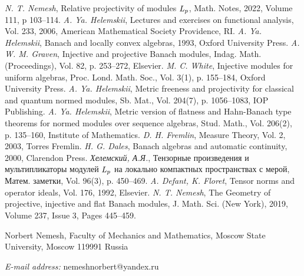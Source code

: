 \documentclass[12pt]{article}
\begin{document}
\begin{thebibliography}{999}
    \textit{N. T. Nemesh}, Relative projectivity of 
    modules $\it{L_p}$, Math. Notes, 2022, Volume 111, p 103--114.
    \textit{A. Ya. Helemskii}, Lectures and 
    exercises on functional analysis, Vol. 233, {2006}, 
    American Mathematical Society Providence, RI.
    \textit{A. Ya. Helemskii}, Banach and locally 
    convex algebras, {1993}, Oxford University Press.
    \textit{A. W. M. Graven}, Injective and 
    projective Banach modules, Indag. Math. (Proceedings), Vol. 82, p. 253--272,
    Elsevier.
    \textit{M. C. White}, Injective modules for uniform 
    algebras, Proc. Lond. Math. Soc., Vol. 3(1), p. 155--184, Oxford University 
    Press.
    \textit{A. Ya. Helemskii}, Metric freeness and 
    projectivity for classical and quantum normed modules, Sb. Mat., 
    Vol. 204(7), p. 1056--1083, IOP Publishing.
    \textit{A. Ya. Helemskii}, Metric version of 
    flatness and Hahn-Banach type theorems for normed modules over sequence 
    algebras, Stud. Math., Vol. 206(2), p. 135--160, Institute of Mathematics.
    \textit{D. H. Fremlin}, Measure Theory, Vol. 2,
    {2003}, Torres Fremlin.
    \textit{H. G. Dales}, Banach algebras and 
    automatic continuity, {2000}, Clarendon Press.
    \textit{Хелемский, А.Я.}, Тензорные 
    произведения и мультипликаторы модулей $\it{L_p}$ на локально компактных 
    пространствах с мерой, Матем. заметки, Vol. 96(3), p. 450--469.
    \textit{A. Defant, K. Floret}, Tensor norms and 
    operator ideals, Vol. 176, {1992}, Elsevier.
    \textit{N. T. Nemesh}, The Geometry of 
    projective, injective and flat Banach modules, J. Math. Sci. (New York), 
    2019, Volume 237, Issue 3, Pages 445–459.
\end{thebibliography}

Norbert Nemesh, Faculty of Mechanics and Mathematics, Moscow State University,
Moscow 119991 Russia

\textit{E-mail address:} nemeshnorbert@yandex.ru
\end{document}
